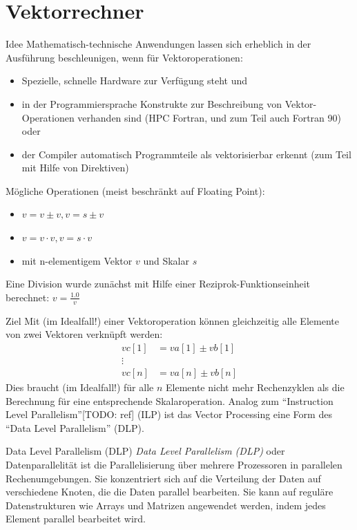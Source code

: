 \section{Vektorrechner}

\begin{defi}[Vektorprozessoren]{Idee}
    Mathematisch-technische Anwendungen lassen sich erheblich in der Ausführung beschleunigen,
    wenn für Vektoroperationen:
    \begin{itemize}
        \item Spezielle, schnelle Hardware zur Verfügung steht und
        \item in der Programmiersprache Konstrukte zur Beschreibung von Vektor-Operationen verhanden sind
              (HPC Fortran, und zum Teil auch Fortran 90) oder
        \item der Compiler automatisch Programmteile als vektorisierbar erkennt
              (zum Teil mit Hilfe von Direktiven)
    \end{itemize}
    Mögliche Operationen (meist beschränkt auf Floating Point):
    \begin{itemize}
        \item $v = v \pm v, v = s \pm v$
        \item $v = v \cdot v, v = s \cdot v$
        \item mit n-elementigem Vektor $v$ und Skalar $s$
    \end{itemize}
    Eine Division wurde zunächst mit Hilfe einer Reziprok-Funktionseinheit berechnet:
    $v = \frac{1.0}{v}$
\end{defi}

\begin{defi}[Vektorprozessoren]{Ziel}
    Mit (im Idealfall!) einer Vektoroperation können gleichzeitig alle Elemente von zwei Vektoren verknüpft werden:
    \begin{align*}
        vc[1] & = va[1] \pm vb[1] \\
        \vdots                    \\
        vc[n] & = va[n] \pm vb[n]
    \end{align*}
    Dies braucht (im Idealfall!) für alle $n$ Elemente nicht mehr Rechenzyklen als die Berechnung für eine entsprechende Skalaroperation.
    Analog zum \enquote{Instruction Level Parallelism}[TODO: ref] (ILP) ist das Vector Processing eine Form des \enquote{Data Level Parallelism} (DLP).
\end{defi}

\begin{defi}{Data Level Parallelism (DLP)}
    \emph{Data Level Parallelism (DLP)} oder Datenparallelität ist die Parallelisierung über mehrere Prozessoren in parallelen Rechenumgebungen.
    Sie konzentriert sich auf die Verteilung der Daten auf verschiedene Knoten, die die Daten parallel bearbeiten.
    Sie kann auf reguläre Datenstrukturen wie Arrays und Matrizen angewendet werden, indem jedes Element parallel bearbeitet wird.
\end{defi}

